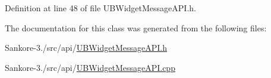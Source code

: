 Definition at line 48 of file U\-B\-Widget\-Message\-A\-P\-I.\-h.



The documentation for this class was generated from the following files\-:\begin{DoxyCompactItemize}
\item 
Sankore-\/3./src/api/\hyperlink{_u_b_widget_message_a_p_i_8h}{U\-B\-Widget\-Message\-A\-P\-I.\-h}\item 
Sankore-\/3./src/api/\hyperlink{_u_b_widget_message_a_p_i_8cpp}{U\-B\-Widget\-Message\-A\-P\-I.\-cpp}\end{DoxyCompactItemize}
